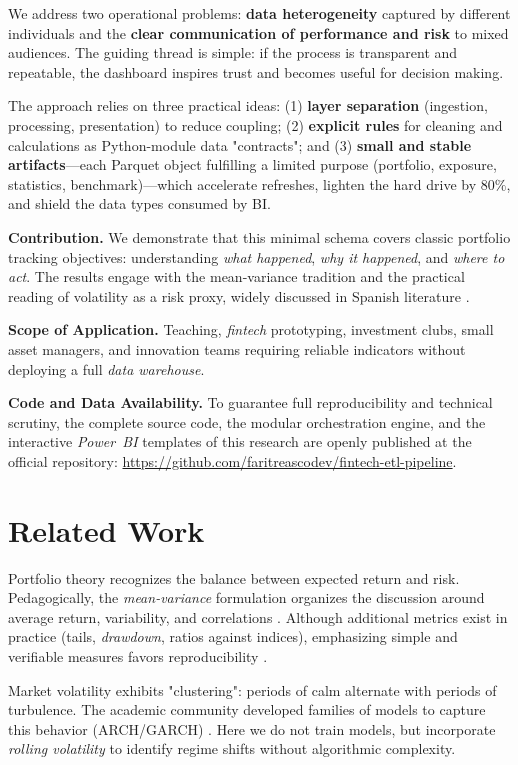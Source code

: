 \documentclass[conference]{IEEEtran}
\begin{document}
We address two operational problems: \textbf{data heterogeneity} captured by different individuals and the \textbf{clear communication of performance and risk} to mixed audiences. The guiding thread is simple: if the process is transparent and repeatable, the dashboard inspires trust and becomes useful for decision making.

The approach relies on three practical ideas: (1) \textbf{layer separation} (ingestion, processing, presentation) to reduce coupling; (2) \textbf{explicit rules} for cleaning and calculations as Python-module data "contracts"; and (3) \textbf{small and stable artifacts}---each Parquet object fulfilling a limited purpose (portfolio, exposure, statistics, benchmark)---which accelerate refreshes, lighten the hard drive by $80\%$, and shield the data types consumed by BI.

\textbf{Contribution.} We demonstrate that this minimal schema covers classic portfolio tracking objectives: understanding \emph{what happened}, \emph{why it happened}, and \emph{where to act}. The results engage with the mean-variance tradition and the practical reading of volatility as a risk proxy, widely discussed in Spanish literature \cite{zapata2022,macias2020,ramirez2016,barbosa2019,gaona2020,novoa2019}.

\textbf{Scope of Application.} Teaching, \emph{fintech} prototyping, investment clubs, small asset managers, and innovation teams requiring reliable indicators without deploying a full \emph{data warehouse}.

\textbf{Code and Data Availability.} To guarantee full reproducibility and technical scrutiny, the complete source code, the modular orchestration engine, and the interactive \emph{Power~BI} templates of this research are openly published at the official repository: \url{https://github.com/faritreascodev/fintech-etl-pipeline}.
\section{Related Work}
Portfolio theory recognizes the balance between expected return and risk. Pedago\-gically, the \emph{mean-variance} formulation organizes the discussion around average return, variability, and correlations \cite{zapata2022,macias2020}. Although additional metrics exist in practice (tails, \emph{drawdown}, ratios against indices), emphasizing simple and verifiable measures favors reproducibility \cite{ramirez2016}.

Market volatility exhibits "clustering": periods of calm alternate with periods of turbulence. The academic community developed families of models to capture this behavior (ARCH/GARCH) \cite{barbosa2019,gaona2020}. Here we do not train models, but incorporate \emph{rolling volatility} to identify regime shifts without algorithmic complexity.
\end{document}
